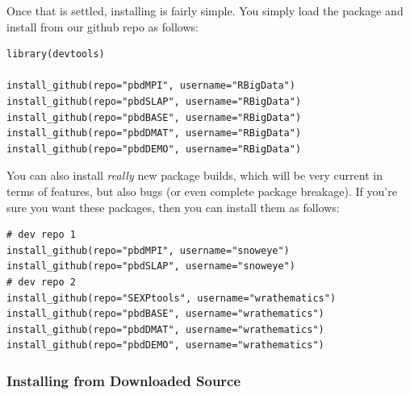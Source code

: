 Once that is settled, installing is fairly simple.  You simply load the  package and install from our github repo as follows:
\begin{lstlisting}[language=rr]
library(devtools)

install_github(repo="pbdMPI", username="RBigData")
install_github(repo="pbdSLAP", username="RBigData")
install_github(repo="pbdBASE", username="RBigData")
install_github(repo="pbdDMAT", username="RBigData")
install_github(repo="pbdDEMO", username="RBigData")
\end{lstlisting}

You can also install \emph{really} new package builds, which will be very current in terms of features, but also bugs (or even complete package breakage).  If you're sure you want these packages, then you can install them as follows:

\begin{lstlisting}[language=rr]
# dev repo 1
install_github(repo="pbdMPI", username="snoweye")
install_github(repo="pbdSLAP", username="snoweye")
# dev repo 2
install_github(repo="SEXPtools", username="wrathematics")
install_github(repo="pbdBASE", username="wrathematics")
install_github(repo="pbdDMAT", username="wrathematics")
install_github(repo="pbdDEMO", username="wrathematics")
\end{lstlisting}



\subsubsection{Installing from Downloaded Source}


